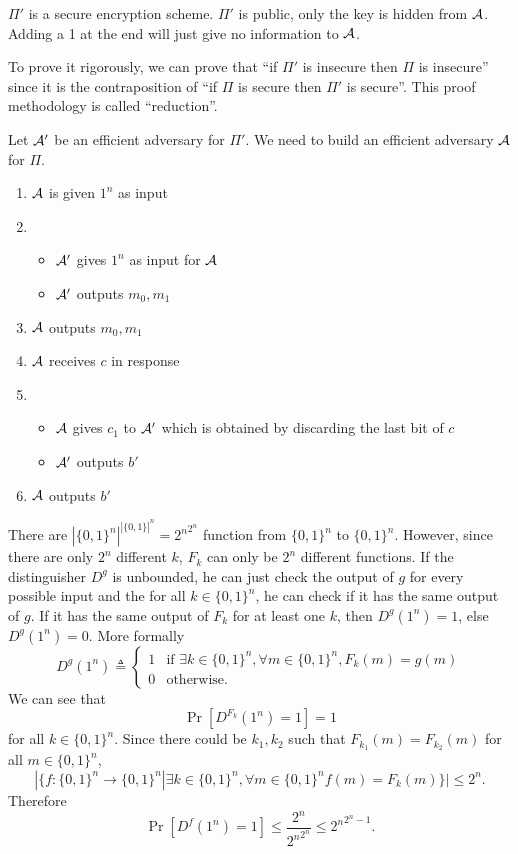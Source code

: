 \begin{solution}
  $\Pi'$ is a secure encryption scheme.
  $\Pi'$ is public, only the key is hidden from $\mathcal{A}$.
  Adding a 1 at the end will just give no information to $\mathcal{A}$.

  To prove it rigorously, we can prove that ``if $\Pi'$ is insecure then $\Pi$ is insecure''
  since it is the contraposition of ``if $\Pi$ is secure then $\Pi'$ is secure''.
  This proof methodology is called ``reduction''.

  Let $\mathcal{A}'$ be an efficient adversary for $\Pi'$.
  We need to build an efficient adversary $\mathcal{A}$ for $\Pi$.
  \begin{enumerate}
    \item $\mathcal{A}$ is given $1^n$ as input
    \item
      \begin{itemize}
        \item $\mathcal{A}'$ gives $1^n$ as input for $\mathcal{A}$
        \item $\mathcal{A}'$ outputs $m_0, m_1$
      \end{itemize}
    \item $\mathcal{A}$ outputs $m_0, m_1$
    \item $\mathcal{A}$ receives $c$ in response
    \item
      \begin{itemize}
        \item $\mathcal{A}$ gives $c_1$ to $\mathcal{A}'$ which is obtained by discarding the last bit of $c$
        \item $\mathcal{A}'$ outputs $b'$
      \end{itemize}
    \item $\mathcal{A}$ outputs $b'$
  \end{enumerate}
\end{solution}

\begin{solution}
  There are $|\{0,1\}^n|^{|\{0,1\}|^n} = {2^n}^{2^n}$ function from $\{0,1\}^n$ to $\{0,1\}^n$.
  However, since there are only $2^n$ different $k$, $F_k$ can only be $2^n$ different functions.
  If the distinguisher $D^g$ is unbounded, he can just check the output of $g$ for every possible input and
  the for all $k \in \{0,1\}^n$, he can check if it has the same output of $g$.
  If it has the same output of $F_k$ for at least one $k$, then $D^g(1^n) = 1$, else $D^g(1^n) = 0$.
  More formally
  \[
    D^g(1^n) \triangleq
    \begin{cases}
      1 & \text{if }\exists k \in \{0,1\}^n, \forall m \in \{0,1\}^n, F_k(m) = g(m)\\
      0 & \text{otherwise.}
    \end{cases}
  \]
  We can see that
  \[ \Pr[D^{F_k}(1^n) = 1] = 1 \]
  for all $k \in \{0,1\}^n$.
  Since there could be $k_1,k_2$ such that $F_{k_1}(m) = F_{k_2}(m)$ for all $m \in \{0,1\}^n$,
  \[ |\{f : \{0,1\}^n \to \{0,1\}^n | \exists k \in \{0,1\}^n, \forall m \in \{0,1\}^n f(m) = F_k(m) \}| \leq 2^n. \]
  Therefore
  \[ \Pr[D^{f}(1^n) = 1] \leq \frac{2^n}{{2^n}^{2^n}} \leq {2^n}^{2^n-1}. \]
\end{solution}
